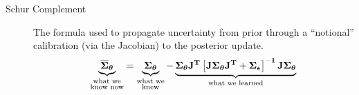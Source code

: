 \documentclass[english]{article}
\begin{document}
\begin{description}
\item [Schur Complement] The formula used to propagate uncertainty from prior through a ``notional'' calibration (via the Jacobian) to the posterior update.
\begin{equation}
\underbrace{\overline{\boldsymbol{\Sigma}}_{\boldsymbol{\theta}}}_{\substack{\text{what we} \\ \text{know now}}} = \underbrace{\boldsymbol{\Sigma}_{\boldsymbol{\theta}}}_{\substack{\text{what we} \\ \text{knew}}} - \underbrace{\boldsymbol{\Sigma}_{\boldsymbol{\theta}}\bf{J}^T\left[\bf{J}\boldsymbol{\Sigma}_{\boldsymbol{\theta}}\bf{J}^T + \boldsymbol{\Sigma}_{\boldsymbol{\epsilon}}\right]^{-1}\bf{J}\boldsymbol{\Sigma}_{\boldsymbol{\theta}}}_{\text{what we learned}}
\end{equation}
\end{description}
\end{document}
